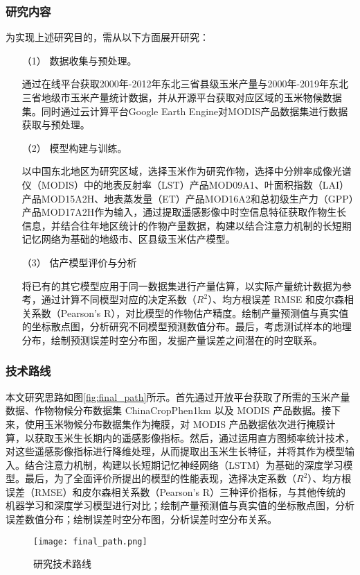 \subsubsection{研究内容}
\par 为实现上述研究目的，需从以下方面展开研究：
\begin{itemize}
  \item [（1）] 数据收集与预处理。
  \par 通过在线平台获取2000年-2012年东北三省县级玉米产量与2000年-2019年东北三省地级市玉米产量统计数据，并从开源平台获取对应区域的玉米物候数据集。同时通过云计算平台Google Earth Engine对MODIS产品数据集进行数据获取与预处理。
  \item [（2）] 模型构建与训练。
  \par 以中国东北地区为研究区域，选择玉米作为研究作物，选择中分辨率成像光谱仪（MODIS）中的地表反射率（LST）产品MOD09A1、叶面积指数（LAI）产品MOD15A2H、地表蒸发量（ET）产品MOD16A2和总初级生产力（GPP）产品MOD17A2H作为输入，通过提取遥感影像中时空信息特征获取作物生长信息，并结合往年地区统计的作物产量数据，构建以结合注意力机制的长短期记忆网络为基础的地级市、区县级玉米估产模型。
  \item [（3）] 估产模型评价与分析
  \par 将已有的其它模型应用于同一数据集进行产量估算，以实际产量统计数据为参考，通过计算不同模型对应的决定系数（$R^2$）、均方根误差 RMSE 和皮尔森相关系数（Pearson's R），对比模型的作物估产精度。绘制产量预测值与真实值的坐标散点图，分析研究不同模型预测数值分布。最后，考虑测试样本的地理分布，绘制预测误差时空分布图，发掘产量误差之间潜在的时空联系。
\end{itemize}

\subsubsection{技术路线}
\par 本文研究思路如图\autoref{fig:final_path}所示。首先通过开放平台获取了所需的玉米产量数据、作物物候分布数据集 ChinaCropPhen1km 以及 MODIS 产品数据。接下来，使用玉米物候分布数据集作为掩膜，对 MODIS 产品数据依次进行掩膜计算，以获取玉米生长期内的遥感影像指标。然后，通过运用直方图频率统计技术，对这些遥感影像指标进行降维处理，从而提取出玉米生长特征，并将其作为模型输入。结合注意力机制，构建以长短期记忆神经网络（LSTM）为基础的深度学习模型。最后，为了全面评价所提出的模型的性能表现，选择决定系数（$R^2$）、均方根误差（RMSE）和皮尔森相关系数（Pearson's R）三种评价指标，与其他传统的机器学习和深度学习模型进行对比；绘制产量预测值与真实值的坐标散点图，分析误差数值分布；绘制误差时空分布图，分析误差时空分布关系。

\begin{figure}
  \centering
  \texttt{[image: final\_path.png]}
  \caption{研究技术路线}
  \label{fig:final_path}
\end{figure}
